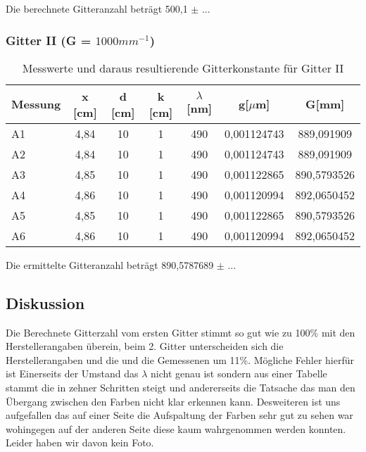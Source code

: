 Die berechnete Gitteranzahl beträgt 500,1 $\pm$ ...

\subsubsection{Gitter II (G = $1000mm^{-1}$)}

\begin{table}[H]
	\centering
	\begin{tabular}{lcccccc}
		\toprule
		Messung & x [cm] & d [cm] & k [cm] & $\lambda$ [nm] & g[$\mu$m]   & G[mm]       \\
		\midrule
		A1      & 4,84   & 10     & 1      & 490            & 0,001124743 & 889,091909  \\
		A2      & 4,84   & 10     & 1      & 490            & 0,001124743 & 889,091909  \\
		A3      & 4,85   & 10     & 1      & 490            & 0,001122865 & 890,5793526 \\
		A4      & 4,86   & 10     & 1      & 490            & 0,001120994 & 892,0650452 \\
		A5      & 4,85   & 10     & 1      & 490            & 0,001122865 & 890,5793526 \\
		A6      & 4,86   & 10     & 1      & 490            & 0,001120994 & 892,0650452 \\
		\bottomrule
	\end{tabular}
	\caption{Messwerte und daraus resultierende Gitterkonstante für Gitter II}
\end{table}

Die ermittelte Gitteranzahl beträgt 890,5787689 $\pm$ ...

\subsection{Diskussion}

Die Berechnete Gitterzahl vom ersten Gitter stimmt so gut wie zu 100\% mit den Herstellerangaben überein, beim 2. 
Gitter unterscheiden sich die Herstellerangaben und die und die Gemessenen um 11\%. Mögliche Fehler hierfür ist Einerseits der Umstand das $\lambda$ nicht genau ist sondern aus einer Tabelle stammt die 
in zehner Schritten steigt und andererseits die Tatsache das man den Übergang zwischen den Farben nicht klar erkennen kann. Desweiteren ist uns aufgefallen das auf einer Seite die 
Aufspaltung der Farben sehr gut zu sehen war wohingegen auf der anderen Seite diese kaum wahrgenommen werden konnten. Leider haben wir davon kein Foto.   
